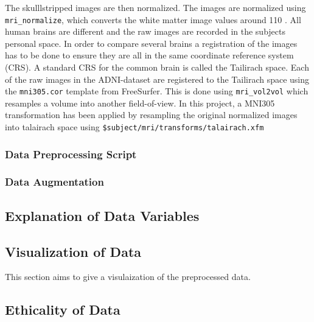 \documentclass[12pt, fleqn, titlepage]{article}
\begin{document}
The skulllstripped images are then normalized. 
The images are normalized using \texttt{mri\_normalize}, which converts the white matter image values around 110 \cite{normalize}. %
All human brains are different and the raw images are recorded in the subjects personal space. 
In order to compare several brains a registration of the images has to be done to ensure they are all in the same coordinate reference system (CRS). 
A standard CRS for the common brain is called the Tailirach space. 
Each of the raw images in the ADNI-dataset are registered to the Tailirach space using the \texttt{mni305.cor} template from FreeSurfer. 
This is done using \texttt{mri\_vol2vol} which resamples a volume into another field-of-view. 
In this project, a MNI305 transformation has been applied by resampling the original normalized images into talairach space using \texttt{\$subject/mri/transforms/talairach.xfm} %

\subsubsection{Data Preprocessing Script}







\subsubsection{Data Augmentation}

\subsection{Explanation of Data Variables}

\subsection{Visualization of Data}
This section aims to give a visulaization of the preprocessed data.


\subsection{Ethicality of Data}
\end{document}
